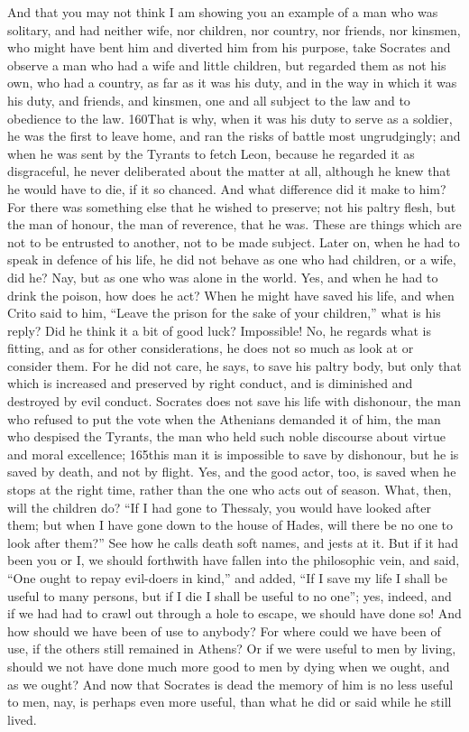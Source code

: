And that you may not think I am showing you an example of a man who was solitary, and had neither wife, nor children, nor country, nor friends, nor kinsmen, who might have bent him and diverted him from his purpose, take Socrates and observe a man who had a wife and little children, but regarded them as not his own, who had a country, as far as it was his duty, and in the way in which it was his duty, and friends, and kinsmen, one and all subject to the law and to obedience to the law. 160That is why, when it was his duty to serve as a soldier, he was the first to leave home, and ran the risks of battle most ungrudgingly; and when he was sent by the Tyrants to fetch Leon, because he regarded it as disgraceful, he never deliberated about the matter at all, although he knew that he would have to die, if it so chanced. And what difference did it make to him? For there was something else that he wished to preserve; not his paltry flesh, but the man of honour, the man of reverence, that he was. These are things which are not to be entrusted to another, not to be made subject. Later on, when he had to speak in defence of his life, he did not behave as one who had children, or a wife, did he? Nay, but as one who was alone in the world. Yes, and when he had to drink the poison, how does he act? When he might have saved his life, and when Crito said to him, ``Leave the prison for the sake of your children,'' what is his reply? Did he think it a bit of good luck? Impossible! No, he regards what is fitting, and as for other considerations, he does not so much as look at or consider them. For he did not care, he says, to save his paltry body, but only that which is increased and preserved by right conduct, and is diminished and destroyed by evil conduct. Socrates does not save his life with dishonour, the man who refused to put the vote when the Athenians demanded it of him, the man who despised the Tyrants, the man who held such noble discourse about virtue and moral excellence; 165this man it is impossible to save by dishonour, but he is saved by death, and not by flight. Yes, and the good actor, too, is saved when he stops at the right time, rather than the one who acts out of season. What, then, will the children do? ``If I had gone to Thessaly, you would have looked after them; but when I have gone down to the house of Hades, will there be no one to look after them?'' See how he calls death soft names, and jests at it. But if it had been you or I, we should forthwith have fallen into the philosophic vein, and said, ``One ought to repay evil-doers in kind,'' and added, ``If I save my life I shall be useful to many persons, but if I die I shall be useful to no one''; yes, indeed, and if we had had to crawl out through a hole to escape, we should have done so! And how should we have been of use to anybody? For where could we have been of use, if the others still remained in Athens? Or if we were useful to men by living, should we not have done much more good to men by dying when we ought, and as we ought? And now that Socrates is dead the memory of him is no less useful to men, nay, is perhaps even more useful, than what he did or said while he still lived.

